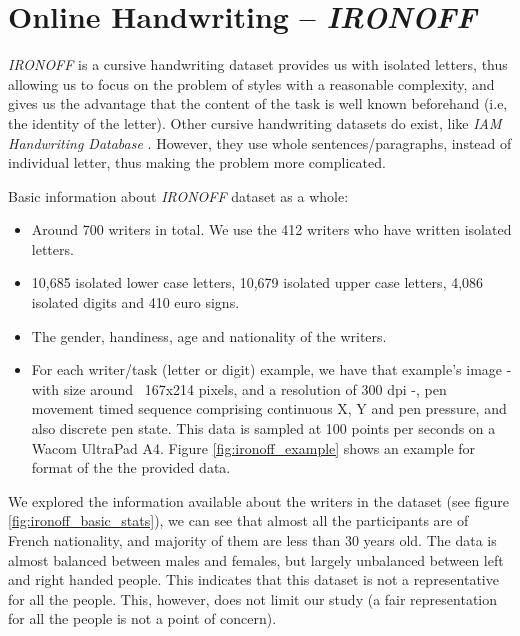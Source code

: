 
\section{Online Handwriting -- \textit{IRONOFF}}

\par \textit{IRONOFF} \citep{791823} is a cursive handwriting dataset provides us with isolated letters, thus allowing us to focus on the problem of styles with a reasonable complexity, and gives us the advantage that the content of the task is well known beforehand (i.e, the identity of the letter). Other cursive handwriting datasets do exist, like \textit{IAM Handwriting Database} \citep{marti1999full}. However, they use whole sentences/paragraphs, instead of individual letter, thus making the problem more complicated.

Basic information about \textit{IRONOFF} dataset as a whole:
\begin{itemize}[noitemsep]
    \item Around 700 writers in total. We use the 412 writers who have written isolated letters.
    \item 10,685 isolated lower case letters, 10,679 isolated upper case letters, 4,086 isolated digits and 410 euro signs.
    \item The gender, handiness, age and nationality of the writers.
    \item For each writer/task (letter or digit) example, we have that example's image - with size around ~167x214 pixels, and a resolution of 300 dpi -, pen movement timed sequence comprising continuous X, Y and pen pressure, and also discrete pen state. This data is sampled at 100 points per seconds on a Wacom UltraPad A4. Figure \ref{fig:ironoff_example} shows an example for format of the the provided data.
\end{itemize}

\par We explored the information available about the writers in the dataset (see figure \ref{fig:ironoff_basic_stats}), we can see that almost all the participants are of French nationality, and majority of them are less than 30 years old. The data is almost balanced between males and females, but largely unbalanced between left and right handed people. This indicates that this dataset is not a representative for all the people. This, however, does not limit our study (a fair representation for all the people is not a point of concern).

